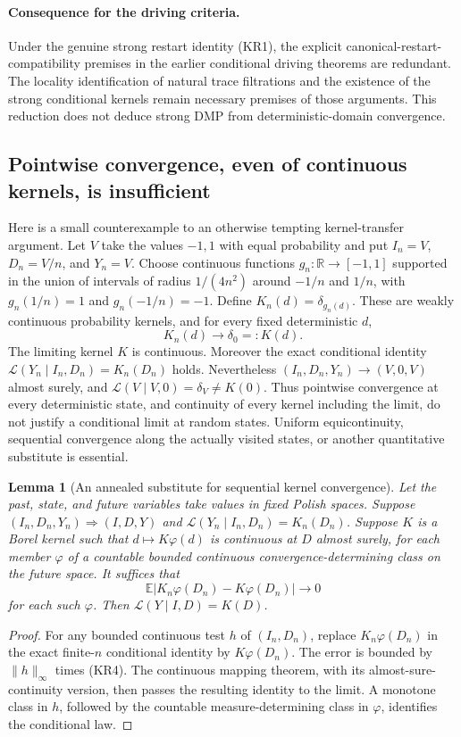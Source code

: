 \documentclass[11pt]{article}
\newtheorem{lemma}[theorem]{Lemma}
\theoremstyle{definition}\newtheorem{definition}[theorem]{Definition}
\theoremstyle{remark}\newtheorem{remark}[theorem]{Remark}
\begin{document}
\paragraph{Consequence for the driving criteria.}
Under the genuine strong restart identity (KR1), the explicit
canonical-restart-compatibility premises in the earlier conditional
driving theorems are redundant. The locality identification of natural
trace filtrations and the existence of the strong conditional kernels
remain necessary premises of those arguments. This reduction does not
deduce strong DMP from deterministic-domain convergence.

\subsection{Pointwise convergence, even of continuous kernels, is insufficient}

Here is a small counterexample to an otherwise tempting kernel-transfer
argument. Let $V$ take the values $-1,1$ with equal probability and put
$I_n=V$, $D_n=V/n$, and $Y_n=V$. Choose continuous functions
$g_n:\mathbb R\to[-1,1]$ supported in the union of intervals of radius
$1/(4n^2)$ around $-1/n$ and $1/n$, with
$g_n(1/n)=1$ and $g_n(-1/n)=-1$. Define
$K_n(d)=\delta_{g_n(d)}$. These are weakly continuous probability kernels,
and for every fixed deterministic $d$,
\[
 K_n(d)\longrightarrow\delta_0=:K(d).
 \tag{KR3}
\]
The limiting kernel $K$ is continuous. Moreover the exact conditional
identity $\mathcal L(Y_n\mid I_n,D_n)=K_n(D_n)$ holds. Nevertheless
$(I_n,D_n,Y_n)\to(V,0,V)$ almost surely, and
$\mathcal L(V\mid V,0)=\delta_V\ne K(0)$. Thus pointwise convergence
at every deterministic state, and continuity of every kernel including
the limit, do not justify a conditional limit at random states. Uniform
equicontinuity, sequential convergence along the actually visited
states, or another quantitative substitute is essential.

\begin{lemma}[An annealed substitute for sequential kernel convergence]
\label{lem:annealed-kernel-transfer}
Let the past, state, and future variables take values in fixed Polish
spaces. Suppose $(I_n,D_n,Y_n)\Rightarrow(I,D,Y)$ and
$\mathcal L(Y_n\mid I_n,D_n)=K_n(D_n)$. Suppose $K$ is a Borel kernel
such that $d\mapsto K\varphi(d)$ is continuous at $D$ almost surely,
for each member $\varphi$ of a countable bounded continuous
convergence-determining class on the future space. It suffices that
\[
 \mathbb E\bigl|K_n\varphi(D_n)-K\varphi(D_n)\bigr|
       \longrightarrow0
 \tag{KR4}
\]
for each such $\varphi$. Then
$\mathcal L(Y\mid I,D)=K(D)$.
\end{lemma}
\begin{proof}
For any bounded continuous test $h$ of $(I_n,D_n)$, replace
$K_n\varphi(D_n)$ in the exact finite-$n$ conditional identity by
$K\varphi(D_n)$. The error is bounded by $\|h\|_\infty$ times (KR4).
The continuous mapping theorem, with its almost-sure-continuity version,
then passes the resulting identity to the limit. A monotone class in
$h$, followed by the countable measure-determining class in $\varphi$,
identifies the conditional law.
\end{proof}
\end{document}
